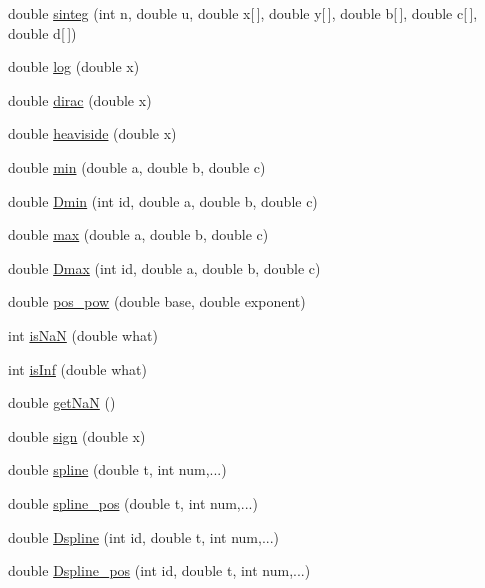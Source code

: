 \begin{DoxyCompactItemize}
double \mbox{\hyperlink{namespaceamici_a158da90aec69a4796fb6f350ac6b71ab}{sinteg}} (int n, double u, double x\mbox{[}$\,$\mbox{]}, double y\mbox{[}$\,$\mbox{]}, double b\mbox{[}$\,$\mbox{]}, double c\mbox{[}$\,$\mbox{]}, double d\mbox{[}$\,$\mbox{]})
\item 
double \mbox{\hyperlink{namespaceamici_adb302c9aafbaa5e180d9f60ee954bb82}{log}} (double x)
\item 
double \mbox{\hyperlink{namespaceamici_a30a33546875b9dd1a63c29312b316f7e}{dirac}} (double x)
\item 
double \mbox{\hyperlink{namespaceamici_a609b523b00064e82442c1f1519f40bdb}{heaviside}} (double x)
\item 
double \mbox{\hyperlink{namespaceamici_a0e1665a05c4dfee1572bea48f7930502}{min}} (double a, double b, double c)
\item 
double \mbox{\hyperlink{namespaceamici_a6eab5ae993f16386289c3d3e7da90435}{Dmin}} (int id, double a, double b, double c)
\item 
double \mbox{\hyperlink{namespaceamici_a98d705fa2f3a5e7566f99fc26d1573de}{max}} (double a, double b, double c)
\item 
double \mbox{\hyperlink{namespaceamici_a9afb37cc1fa38a1bfa427f9c27255e5b}{Dmax}} (int id, double a, double b, double c)
\item 
double \mbox{\hyperlink{namespaceamici_af596fe82a4ff6588a527a73d659c4db6}{pos\+\_\+pow}} (double base, double exponent)
\item 
int \mbox{\hyperlink{namespaceamici_a7452657cd5f8d541f9e823df5e82c516}{is\+NaN}} (double what)
\item 
int \mbox{\hyperlink{namespaceamici_a10c0a2eb43575a155a34f5bb280f7973}{is\+Inf}} (double what)
\item 
double \mbox{\hyperlink{namespaceamici_ad41a03e53c2aaeeb82aad5791bf3ee28}{get\+NaN}} ()
\item 
double \mbox{\hyperlink{namespaceamici_a8f3cba07aa75b7320ae8bd6c0aeac498}{sign}} (double x)
\item 
double \mbox{\hyperlink{namespaceamici_a34f81e95053af0b2d366f7ab636e603a}{spline}} (double t, int num,...)
\item 
double \mbox{\hyperlink{namespaceamici_aa814c7e3b7d45495d0607f3af88027f6}{spline\+\_\+pos}} (double t, int num,...)
\item 
double \mbox{\hyperlink{namespaceamici_ad4f5bcfd873d2945ed546194aa80c078}{Dspline}} (int id, double t, int num,...)
\item 
double \mbox{\hyperlink{namespaceamici_a0d1393ca0920ddb402450709cc505f4f}{Dspline\+\_\+pos}} (int id, double t, int num,...)

\end{DoxyCompactItemize}
